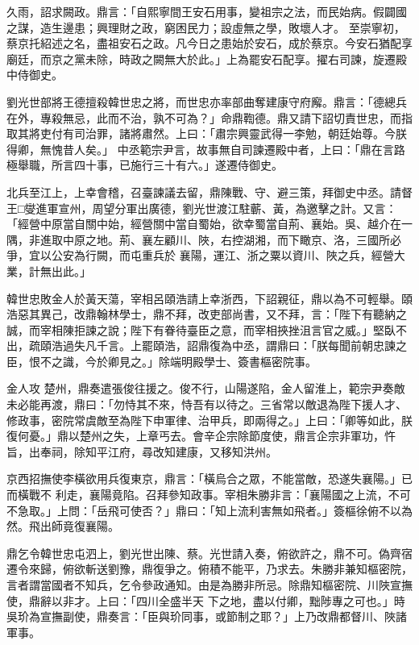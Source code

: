 \begin{pinyinscope}
 久雨，詔求闕政。鼎言：「自熙寧間王安石用事，變祖宗之法，而民始病。假闢國之謀，造生邊患；興理財之政，窮困民力；設虛無之學，敗壞人才。
 至崇寧初，蔡京托紹述之名，盡祖安石之政。凡今日之患始於安石，成於蔡京。今安石猶配享廟廷，而京之黨未除，時政之闕無大於此。」上為罷安石配享。擢右司諫，旋遷殿中侍御史。



 劉光世部將王德擅殺韓世忠之將，而世忠亦率部曲奪建康守府廨。鼎言：「德總兵在外，專殺無忌，此而不治，孰不可為？」命鼎鞫德。鼎又請下詔切責世忠，而指取其將吏付有司治罪，諸將肅然。上曰：「肅宗興靈武得一李勉，朝廷始尊。今朕得卿，無愧昔人矣。」
 中丞範宗尹言，故事無自司諫遷殿中者，上曰：「鼎在言路極舉職，所言四十事，已施行三十有六。」遂遷侍御史。



 北兵至江上，上幸會稽，召臺諫議去留，鼎陳戰、守、避三策，拜御史中丞。請督王□燮進軍宣州，周望分軍出廣德，劉光世渡江駐蘄、黃，為邀擊之計。又言：「經營中原當自關中始，經營關中當自蜀始，欲幸蜀當自荊、襄始。吳、越介在一隅，非進取中原之地。荊、襄左顧川、陜，右控湖湘，而下瞰京、洛，三國所必爭，宜以公安為行闕，而屯重兵於
 襄陽，運江、浙之粟以資川、陜之兵，經營大業，計無出此。」



 韓世忠敗金人於黃天蕩，宰相呂頤浩請上幸浙西，下詔親征，鼎以為不可輕舉。頤浩惡其異己，改鼎翰林學士，鼎不拜，改吏部尚書，又不拜，言：「陛下有聽納之誠，而宰相陳拒諫之說；陛下有眷待臺臣之意，而宰相挾挫沮言官之威。」堅臥不出，疏頤浩過失凡千言。上罷頤浩，詔鼎復為中丞，謂鼎曰：「朕每聞前朝忠諫之臣，恨不之識，今於卿見之。」除端明殿學士、簽書樞密院事。



 金人攻
 楚州，鼎奏遣張俊往援之。俊不行，山陽遂陷，金人留淮上，範宗尹奏敵未必能再渡，鼎曰：「勿恃其不來，恃吾有以待之。三省常以敵退為陛下援人才、修政事，密院常虞敵至為陛下申軍律、治甲兵，即兩得之。」上曰：「卿等如此，朕復何憂。」鼎以楚州之失，上章丐去。會辛企宗除節度使，鼎言企宗非軍功，忤旨，出奉祠，除知平江府，尋改知建康，又移知洪州。



 京西招撫使李橫欲用兵復東京，鼎言：「橫烏合之眾，不能當敵，恐遂失襄陽。」已而橫戰不
 利走，襄陽竟陷。召拜參知政事。宰相朱勝非言：「襄陽國之上流，不可不急取。」上問：「岳飛可使否？」鼎曰：「知上流利害無如飛者。」簽樞徐俯不以為然。飛出師竟復襄陽。



 鼎乞令韓世忠屯泗上，劉光世出陳、蔡。光世請入奏，俯欲許之，鼎不可。偽齊宿遷令來歸，俯欲斬送劉豫，鼎復爭之。俯積不能平，乃求去。朱勝非兼知樞密院，言者謂當國者不知兵，乞令參政通知。由是為勝非所忌。除鼎知樞密院、川陜宣撫使，鼎辭以非才。上曰：「四川全盛半天
 下之地，盡以付卿，黜陟專之可也。」時吳玠為宣撫副使，鼎奏言：「臣與玠同事，或節制之耶？」上乃改鼎都督川、陜諸軍事。




\end{pinyinscope}
